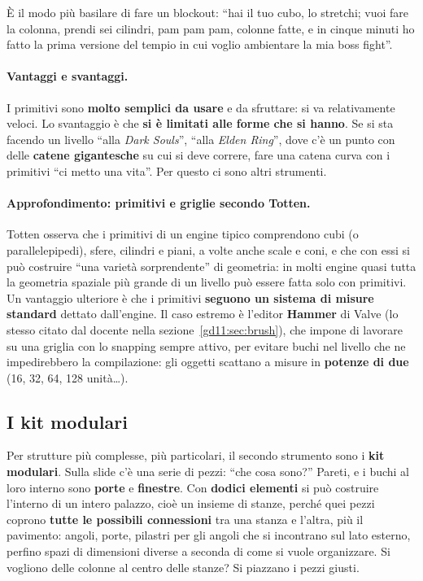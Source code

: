 È il modo più basilare di fare un blockout: ``hai il tuo cubo, lo stretchi;
vuoi fare la colonna, prendi sei cilindri, pam pam pam, colonne fatte, e in
cinque minuti ho fatto la prima versione del tempio in cui voglio ambientare la
mia boss fight''.

\paragraph{Vantaggi e svantaggi.} I primitivi sono \textbf{molto semplici da
usare} e da sfruttare: si va relativamente veloci. Lo svantaggio è che
\textbf{si è limitati alle forme che si hanno}. Se si sta facendo un livello
``alla \emph{Dark Souls}'', ``alla \emph{Elden Ring}'', dove c'è un punto con
delle \textbf{catene gigantesche} su cui si deve correre, fare una catena curva
con i primitivi ``ci metto una vita''. Per questo ci sono altri strumenti.

\paragraph{Approfondimento: primitivi e griglie secondo Totten.} Totten osserva
che i primitivi di un engine tipico comprendono cubi (o parallelepipedi),
sfere, cilindri e piani, a volte anche scale e coni, e che con essi si può
costruire ``una varietà sorprendente'' di geometria: in molti engine quasi
tutta la geometria spaziale più grande di un livello può essere fatta solo con
primitivi. Un vantaggio ulteriore è che i primitivi \textbf{seguono un sistema
di misure standard} dettato dall'engine. Il caso estremo è l'editor
\textbf{Hammer} di Valve (lo stesso citato dal docente nella
sezione~\ref{gd11:sec:brush}), che impone di lavorare su una griglia con lo
snapping sempre attivo, per evitare buchi nel livello che ne impedirebbero la
compilazione: gli oggetti scattano a misure in \textbf{potenze di due} (16, 32,
64, 128 unità\ldots).

\subsection{I kit modulari}
\label{gd11:sec:modulari}

Per strutture più complesse, più particolari, il secondo strumento sono i
\textbf{kit modulari}. Sulla slide c'è una serie di pezzi: ``che cosa sono?''
Pareti, e i buchi al loro interno sono \textbf{porte} e \textbf{finestre}. Con
\textbf{dodici elementi} si può costruire l'interno di un intero palazzo, cioè
un insieme di stanze, perché quei pezzi coprono \textbf{tutte le possibili
connessioni} tra una stanza e l'altra, più il pavimento: angoli, porte,
pilastri per gli angoli che si incontrano sul lato esterno, perfino spazi di
dimensioni diverse a seconda di come si vuole organizzare. Si vogliono delle
colonne al centro delle stanze? Si piazzano i pezzi giusti.

